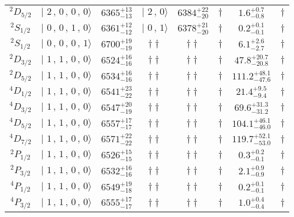 \begin{tabular}{c| c c c c c c c}
$^{2}D_{5/2}$ & $\vert \,\,2\,,\,0\,,\,0\,,\,0 \rangle $ & $6365^{+13}_{-13}$ & $\vert \,\,2\,,\,0 \rangle$ & $6384^{+22}_{-20}$ & $\dagger$ & $1.6^{+0.7}_{-0.8}$ & $\dagger$ \\ 
$^{2}S_{1/2}$ & $\vert \,\,0\,,\,0\,,\,1\,,\,0 \rangle $ & $6361^{+12}_{-12}$ & $\vert \,\,0\,,\,1 \rangle$ & $6378^{+21}_{-20}$ & $\dagger$ & $0.2^{+0.1}_{-0.1}$ & $\dagger$ \\ 
$^{2}S_{1/2}$ & $\vert \,\,0\,,\,0\,,\,0\,,\,1 \rangle $ & $6700^{+19}_{-19}$ & $\dagger\dagger$ & $\dagger\dagger$ & $\dagger$ & $6.1^{+2.6}_{-2.7}$ & $\dagger$ \\ 
$^{2}D_{3/2}$ & $\vert \,\,1\,,\,1\,,\,0\,,\,0 \rangle $ & $6524^{+16}_{-16}$ & $\dagger\dagger$ & $\dagger\dagger$ & $\dagger$ & $47.8^{+20.7}_{-20.8}$ & $\dagger$ \\ 
$^{2}D_{5/2}$ & $\vert \,\,1\,,\,1\,,\,0\,,\,0 \rangle $ & $6534^{+16}_{-16}$ & $\dagger\dagger$ & $\dagger\dagger$ & $\dagger$ & $111.2^{+48.1}_{-47.6}$ & $\dagger$ \\ 
$^{4}D_{1/2}$ & $\vert \,\,1\,,\,1\,,\,0\,,\,0 \rangle $ & $6541^{+23}_{-22}$ & $\dagger\dagger$ & $\dagger\dagger$ & $\dagger$ & $21.4^{+9.5}_{-9.4}$ & $\dagger$ \\ 
$^{4}D_{3/2}$ & $\vert \,\,1\,,\,1\,,\,0\,,\,0 \rangle $ & $6547^{+20}_{-19}$ & $\dagger\dagger$ & $\dagger\dagger$ & $\dagger$ & $69.6^{+31.3}_{-31.2}$ & $\dagger$ \\ 
$^{4}D_{5/2}$ & $\vert \,\,1\,,\,1\,,\,0\,,\,0 \rangle $ & $6557^{+17}_{-17}$ & $\dagger\dagger$ & $\dagger\dagger$ & $\dagger$ & $104.1^{+46.1}_{-46.0}$ & $\dagger$ \\ 
$^{4}D_{7/2}$ & $\vert \,\,1\,,\,1\,,\,0\,,\,0 \rangle $ & $6571^{+22}_{-22}$ & $\dagger\dagger$ & $\dagger\dagger$ & $\dagger$ & $119.7^{+52.1}_{-53.0}$ & $\dagger$ \\ 
$^{2}P_{1/2}$ & $\vert \,\,1\,,\,1\,,\,0\,,\,0 \rangle $ & $6526^{+15}_{-15}$ & $\dagger\dagger$ & $\dagger\dagger$ & $\dagger$ & $0.3^{+0.2}_{-0.1}$ & $\dagger$ \\ 
$^{2}P_{3/2}$ & $\vert \,\,1\,,\,1\,,\,0\,,\,0 \rangle $ & $6532^{+16}_{-16}$ & $\dagger\dagger$ & $\dagger\dagger$ & $\dagger$ & $2.1^{+0.9}_{-0.9}$ & $\dagger$ \\ 
$^{4}P_{1/2}$ & $\vert \,\,1\,,\,1\,,\,0\,,\,0 \rangle $ & $6549^{+19}_{-18}$ & $\dagger\dagger$ & $\dagger\dagger$ & $\dagger$ & $0.2^{+0.1}_{-0.1}$ & $\dagger$ \\ 
$^{4}P_{3/2}$ & $\vert \,\,1\,,\,1\,,\,0\,,\,0 \rangle $ & $6555^{+17}_{-17}$ & $\dagger\dagger$ & $\dagger\dagger$ & $\dagger$ & $1.0^{+0.4}_{-0.4}$ & $\dagger$ \\ 

\end{tabular}
